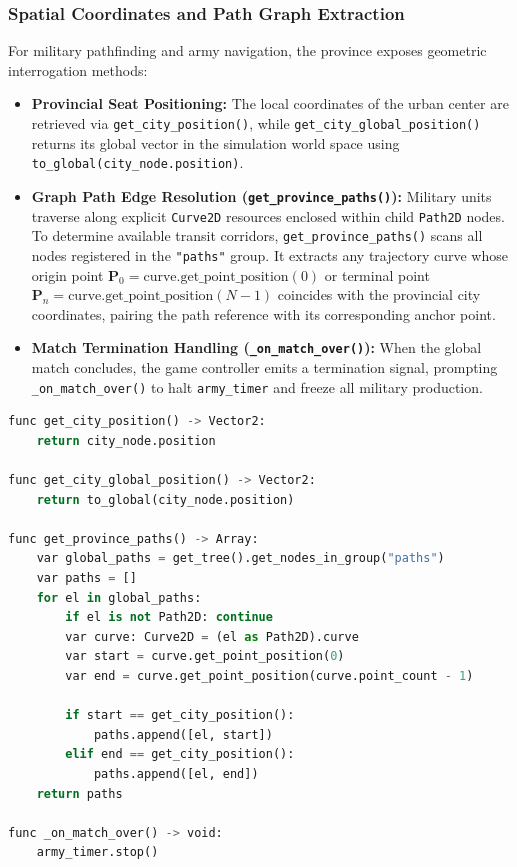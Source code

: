 \subsubsection{Spatial Coordinates and Path Graph Extraction}
For military pathfinding and army navigation, the province exposes geometric interrogation methods:
\begin{itemize}
    \item \textbf{Provincial Seat Positioning:} The local coordinates of the urban center are retrieved via \texttt{get\_city\_position()}, while \texttt{get\_city\_global\_position()} returns its global vector in the simulation world space using \texttt{to\_global(city\_node.position)}.
    \item \textbf{Graph Path Edge Resolution (\texttt{get\_province\_paths()}):} Military units traverse along explicit \texttt{Curve2D} resources enclosed within child \texttt{Path2D} nodes. To determine available transit corridors, \texttt{get\_province\_paths()} scans all nodes registered in the \texttt{"paths"} group. It extracts any trajectory curve whose origin point $\mathbf{P}_0 = \text{curve.get\_point\_position}(0)$ or terminal point $\mathbf{P}_n = \text{curve.get\_point\_position}(N-1)$ coincides with the provincial city coordinates, pairing the path reference with its corresponding anchor point.
    \item \textbf{Match Termination Handling (\texttt{\_on\_match\_over()}):} When the global match concludes, the game controller emits a termination signal, prompting \texttt{\_on\_match\_over()} to halt \texttt{army\_timer} and freeze all military production.
\end{itemize}

\begin{lstlisting}[language=python, caption={Spatial positioning, path extraction, and match lifecycle handlers.}, label={lst:spatial_and_lifecycle_helpers}]
func get_city_position() -> Vector2:
    return city_node.position

func get_city_global_position() -> Vector2:
    return to_global(city_node.position)

func get_province_paths() -> Array:
    var global_paths = get_tree().get_nodes_in_group("paths")
    var paths = []
    for el in global_paths:
        if el is not Path2D: continue
        var curve: Curve2D = (el as Path2D).curve
        var start = curve.get_point_position(0)
        var end = curve.get_point_position(curve.point_count - 1)

        if start == get_city_position():
            paths.append([el, start])
        elif end == get_city_position():
            paths.append([el, end])
    return paths

func _on_match_over() -> void:
    army_timer.stop()
\end{lstlisting}

